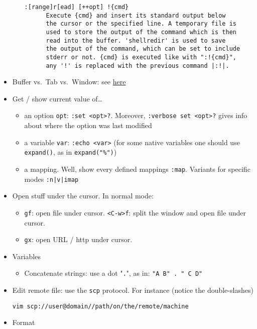 \documentclass[a4paper,12pt,%
              final%
              ]{article}
\begin{document}
\begin{itemize}
\begin{itemize}
\begin{verbatim}
:[range]r[ead] [++opt] !{cmd}
      Execute {cmd} and insert its standard output below
      the cursor or the specified line. A temporary file is
      used to store the output of the command which is then
      read into the buffer. 'shellredir' is used to save
      the output of the command, which can be set to include
      stderr or not. {cmd} is executed like with ":!{cmd}",
      any '!' is replaced with the previous command |:!|.
\end{verbatim}
    \end{itemize}
  \item Buffer vs.\ Tab vs.\ Window: see
    \href{https://joshldavis.com/2014/04/05/vim-tab-madness-buffers-vs-tabs/}{here}
  \item Get / show current value of\ldots
    \begin{itemize}
      \item an option \verb|opt|: \verb|:set <opt>?|. Moreover,
        \verb|:verbose set <opt>?| gives info about where the option was last
        modified
      \item a variable \verb|var|: \verb|:echo <var>| (for some native variables one
        should use \verb|expand()|, as in \verb|expand("%")|)
      \item a mapping. Well, show every defined mappings \verb|:map|. Variants for
        specific modes \verb!:n|v|imap!
    \end{itemize}
  \item Open stuff under the cursor. In normal mode:
    \begin{itemize}
      \item \texttt{gf}: open file under cursor. \texttt{<C-w>f}: split the window
        and open file under cursor.
      \item \texttt{gx}: open URL / http under cursor.
    \end{itemize}
  \item Variables
    \begin{itemize}
      \item Concatenate strings: use a dot "\texttt{.}", as in: \verb|"A B" . " C D"|
    \end{itemize}
  \item Edit remote file: use the \texttt{scp} protocol. For instance (notice the
    double-slashes)
\begin{verbatim}
vim scp://user@domain//path/on/the/remote/machine
\end{verbatim}
  \item Format
    \begin{itemize}

\end{itemize}
\end{itemize}
\end{document}
